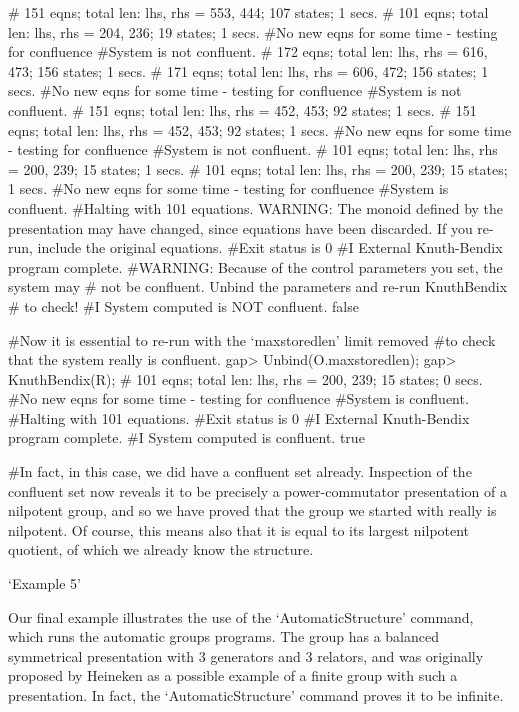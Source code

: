       # 151 eqns; total len: lhs, rhs = 553, 444; 107 states; 1 secs.
      # 101 eqns; total len: lhs, rhs = 204, 236; 19 states; 1 secs.
      #No new eqns for some time - testing for confluence
      #System is not confluent.
      # 172 eqns; total len: lhs, rhs = 616, 473; 156 states; 1 secs.
      # 171 eqns; total len: lhs, rhs = 606, 472; 156 states; 1 secs.
      #No new eqns for some time - testing for confluence
      #System is not confluent.
      # 151 eqns; total len: lhs, rhs = 452, 453; 92 states; 1 secs.
      # 151 eqns; total len: lhs, rhs = 452, 453; 92 states; 1 secs.
      #No new eqns for some time - testing for confluence
      #System is not confluent.
      # 101 eqns; total len: lhs, rhs = 200, 239; 15 states; 1 secs.
      # 101 eqns; total len: lhs, rhs = 200, 239; 15 states; 1 secs.
      #No new eqns for some time - testing for confluence
    #System is confluent.
    #Halting with 101 equations.
    WARNING: The monoid defined by the presentation may have changed,
             since equations have been discarded.
             If you re-run, include the original equations.
      #Exit status is 0
    #I  External Knuth-Bendix program complete.
    #WARNING: Because of the control parameters you set, the system may
    #         not be confluent. Unbind the parameters and re-run KnuthBendix
    #         to check!
    #I  System computed is NOT confluent.
    false

    #Now it is essential to re-run with the `maxstoredlen' limit removed
    #to check that the system really is confluent.
    gap> Unbind(O.maxstoredlen);
    gap> KnuthBendix(R);
      # 101 eqns; total len: lhs, rhs = 200, 239; 15 states; 0 secs.
      #No new eqns for some time - testing for confluence
    #System is confluent.
    #Halting with 101 equations.
    #Exit status is 0
    #I  External Knuth-Bendix program complete.
    #I  System computed is confluent.
    true

    #In fact, in this case, we did have a confluent set already.
\endexample
Inspection  of the confluent  set now  reveals it   to be  precisely a
power-commutator presentation  of  a nilpotent  group,  and so we have
proved that the group we started with really is nilpotent.  Of course,
this means also that it is equal to its largest nilpotent quotient, of
which we already know the structure.

`Example 5'

Our final example illustrates the use of the `AutomaticStructure' command, which
runs  the   automatic groups  programs.    The  group  has  a balanced
symmetrical presentation with 3   generators and 3 relators,  and  was
originally proposed  by  Heineken as a  possible  example of a  finite
group with such a presentation. In fact, the `AutomaticStructure' command proves
it to be infinite.

